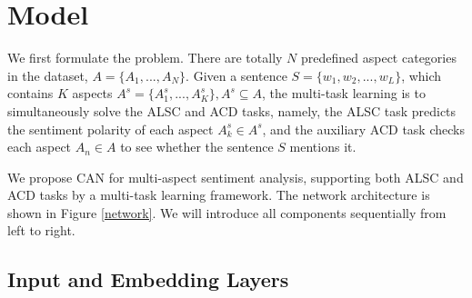 \section{Model}
We first formulate the problem. There are totally $N$ predefined aspect categories in the dataset, $A=\{A_1,...,A_N\}$. Given a sentence $S=\{w_1, w_2, ..., w_L\}$, which contains $K$ aspects $A^s=\{A_1^s,...,A_K^s\}, A^s\subseteq  A$, the multi-task learning is to simultaneously solve the ALSC and ACD tasks, namely, the ALSC task predicts the sentiment polarity of each aspect $A_k^s \in A^s$, and the auxiliary ACD task checks each aspect $A_n \in A$ to see whether the sentence $S$ mentions it.

We propose CAN for multi-aspect sentiment analysis, supporting both ALSC and ACD tasks by a multi-task learning framework. The network architecture is shown in Figure \ref{network}. We will introduce all components sequentially from left to right.

\subsection{Input and Embedding Layers}